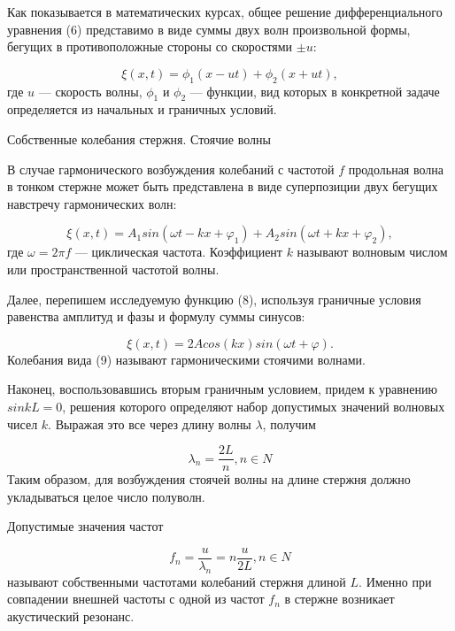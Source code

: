 \documentclass[12pt, a4paper]{article}
\begin{document}
Как показывается в математических курсах,
общее решение дифференциального уравнения (6) представимо в 
виде суммы двух волн произвольной формы, бегущих в противоположные
стороны со скоростями $\pm u$:

\begin{equation}
    \xi(x,t) = \phi_1(x - ut) + \phi_2(x + ut),
\end{equation}
где $u$ --- скорость волны, $\phi_1$ и $\phi_2$ --- функции, вид которых в конкретной задаче
определяется из начальных и граничных условий.

\vspace{1cm}
{\large Собственные колебания стержня. Стоячие волны \\}

В случае гармонического возбуждения колебаний с частотой $f$ продольная волна в тонком стержне может быть представлена 
в виде суперпозиции двух бегущих навстречу гармонических волн:

\begin{equation}
    \xi(x,t) = A_1sin(\omega t - kx + \varphi_1) + A_2sin(\omega t + kx + \varphi_2),
\end{equation}
где $\omega = 2 \pi f$ --- циклическая частота. Коэффициент $k$ называют
волновым числом или пространственной частотой волны. 

Далее, перепишем исследуемую функцию (8), используя граничные
условия равенства амплитуд и фазы и формулу суммы синусов:

\begin{equation}
    \xi(x,t) = 2Acos(kx)sin(\omega t + \varphi).
\end{equation}
Колебания вида (9) называют гармоническими стоячими волнами.

Наконец, воспользовавшись вторым граничным условием, придем к уравнению
$sin kL = 0$, решения которого определяют набор допустимых значений волновых чисел $k$.
Выражая это все через длину волны $\lambda$, получим 

\begin{equation}
    \lambda_n = \frac{2L}{n}, n \in N
\end{equation}
Таким образом, для возбуждения стоячей волны на длине стержня должно
укладываться целое число полуволн.

Допустимые значения частот

\begin{equation}
    f_n = \frac{u}{\lambda_n} = n\frac{u}{2L}, n \in N
\end{equation}
называют собственными частотами колебаний стержня длиной $L$.
Именно при совпадении внешней частоты с одной из частот $f_n$ в стержне
возникает акустический резонанс.
\end{document}
